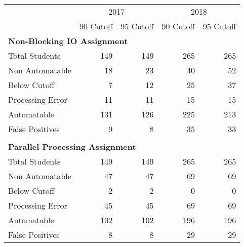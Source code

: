 \begin{tabular}{lrrrr} \toprule
& \multicolumn{2}{c}{2017} & \multicolumn{2}{c}{2018} \\
& 90 Cutoff & 95 Cutoff & 90 Cutoff & 95 Cutoff \\
\midrule
\multicolumn{5}{l}{ \textbf{Non-Blocking IO Assignment} }\\
\tspace Total Students           &   149 &   149 &   265 &   265 \\
\tspace Non Automatable          &    18 &    23 &    40 &    52 \\
\tspace \tspace Below Cutoff     &     7 &    12 &    25 &    37 \\
\tspace \tspace Processing Error &    11 &    11 &    15 &    15 \\
\tspace Automatable              &   131 &   126 &   225 &   213 \\
\tspace \tspace False Positives  &     9 &     8 &    35 &    33 \\
\\
\multicolumn{5}{l}{ \textbf{Parallel Processing Assignment} }\\
\tspace Total Students           &   149 &   149 &   265 &   265 \\
\tspace Non Automatable          &    47 &    47 &    69 &    69 \\
\tspace \tspace Below Cutoff     &     2 &     2 &     0 &     0 \\
\tspace \tspace Processing Error &    45 &    45 &    69 &    69 \\
\tspace Automatable              &   102 &   102 &   196 &   196 \\
\tspace \tspace False Positives  &     8 &     8 &    29 &    29 \\
\bottomrule
\end{tabular}
